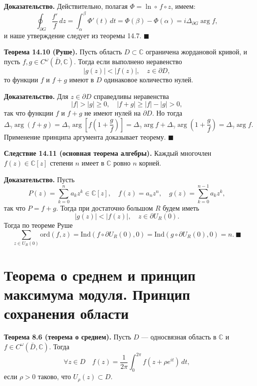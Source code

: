 \documentclass[12pt, a4paper]{article}
\theoremstyle{definition}
\theoremstyle{remark}
\begin{document}
\textbf{Доказательство.} Действительно, полагая $\Phi = \ln \circ \, f \circ z$, имеем:
$$\oint_{\partial G} \frac{f'}{f} \, dz = \int_{\alpha}^{\beta} \Phi'(t) \, dt = \Phi(\beta) - \Phi(\alpha) = i \Delta_{\partial G} \arg f,$$
и наше утверждение следует из теоремы 14.7. $\blacksquare$

\textbf{Теорема 14.10 (Руше).} Пусть область $D \subset \mathbb{C}$ ограничена жордановой кривой, и пусть $f, g \in C^\omega(\bar{D}, \mathbb{C})$. Тогда если выполнено неравенство
\begin{equation}
	|g(z)| < |f(z)|, \quad z \in \partial D,
\end{equation}
то функции $f$ и $f + g$ имеют в $D$ одинаковое количество нулей.

\textbf{Доказательство.} Для $z \in \partial D$ справедливы неравенства
$$|f| > |g| \ge 0, \quad |f + g| \ge |f| - |g| > 0,$$
так что функции $f$ и $f + g$ не имеют нулей на $\partial D$. Но тогда
$$\Delta_\gamma \arg(f + g) = \Delta_\gamma \arg \left[ f \left( 1 + \frac{g}{f} \right) \right] = \Delta_\gamma \arg f + \Delta_\gamma \arg \left(1 + \frac{g}{f}\right) = \Delta_\gamma \arg f.$$
Применение принципа аргумента доказывает теорему. $\blacksquare$

\textbf{Следствие 14.11 (основная теорема алгебры).} Каждый многочлен $f(z) \in \mathbb{C}[z]$ степени $n$ имеет в $\mathbb{C}$ ровно $n$ корней.

\textbf{Доказательство.} Пусть
$$P(z) = \sum_{k=0}^{n} a_k z^k \in \mathbb{C}[z], \quad f(z) = a_n z^n, \quad g(z) = \sum_{k=0}^{n-1} a_k z^k,$$
так что $P = f + g$. Тогда при достаточно большом $R$ будем иметь
$$|g(z)| < |f(z)|, \quad z \in \partial U_R(0).$$
Тогда по теореме Руше
$$\sum_{z \in U_R(0)} \text{ord}(f, z) = \text{Ind}(f \circ \partial U_R(0), 0) = \text{Ind}(g \circ \partial U_R(0), 0) = n. \ \blacksquare$$

\newpage
\section{Теорема о среднем и принцип максимума модуля. Принцип сохранения области}

\textbf{Теорема 8.6 (теорема о среднем).} Пусть $D$ --- односвязная область в $\mathbb{C}$ и $f \in C^\omega(\bar{D}, \mathbb{C})$. Тогда
$$\forall z \in D \quad f(z) = \frac{1}{2\pi} \int_{0}^{2\pi} f(z + \rho e^{it}) \, dt,$$
если $\rho > 0$ таково, что $U_\rho(z) \subset D$.
\end{document}
